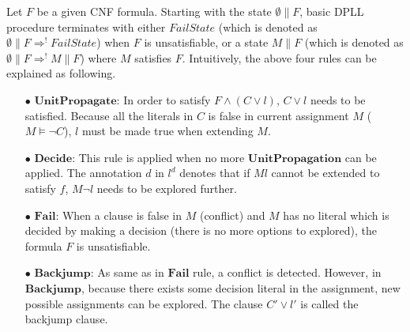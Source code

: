 Let $F$ be a given CNF formula. Starting with the state $\emptyset \parallel F$, basic DPLL procedure terminates with either $FailState$ (which is denoted as $\emptyset \parallel F \Longrightarrow^! FailState$) when $F$ is unsatisfiable, or a state $M \parallel F$ (which is denoted as $\emptyset \parallel F \Longrightarrow^! M \parallel F$) where $M$ satisfies $F$. Intuitively, the above four rules can be explained as following.

\begin{itemize}
\item[$\bullet$] $\mathbf{UnitPropagate}$: In order to satisfy $F \wedge (C \vee l)$, $C \vee l$ needs to be satisfied. Because all the literals in $C$ is false in current assignment $M$ ($M \models \neg C$), $l$ must be made true when extending $M$.
\item[$\bullet$] $\mathbf{Decide}$: This rule is applied when no more $\mathbf{UnitPropagation}$ can be applied. The annotation $d$ in $l^d$ denotes that if $Ml$ cannot be extended to satisfy $f$, $M\neg l$ needs to be explored further.
\item[$\bullet$] $\mathbf{Fail}$: When a clause is false in $M$ (conflict) and $M$ has no literal which is decided by making a decision (there is no more options to explored), the formula $F$ is unsatisfiable.
\item[$\bullet$] $\mathbf{Backjump}$: As same as in $\mathbf{Fail}$ rule, a conflict is detected. However, in $\mathbf{Backjump}$, because there exists some decision literal in the assignment, new possible assignments can be explored. The clause $C' \vee l'$ is called the backjump clause.
\end{itemize}


